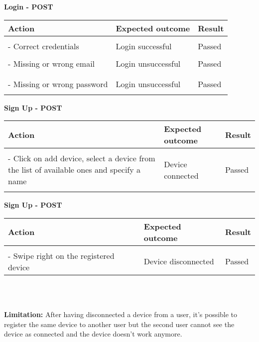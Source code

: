 \textbf{Login - POST}
\begin{center}
	\begin{tabular}{|p{}|p{}|p{}|}
		\hline
		Action & Expected outcome & Result \\
		\hline
		&&\\
		- Correct credentials & Login successful & Passed\\
		\hline
		&&\\
		- Missing or wrong email & Login unsuccessful & Passed\\
		&&\\
		\hline
		&&\\
		- Missing or wrong password & Login unsuccessful & Passed\\
		&&\\
		\hline
	\end{tabular}
\end{center}

\newpage

\textbf{Sign Up - POST}
\begin{center}
	\begin{tabular}{|p{}|p{}|p{}|}
		\hline
		Action & Expected outcome & Result \\
		\hline
		&&\\
		- Click on add device, select a device from the list of available ones and specify a name & Device connected & Passed\\
		&&\\
		\hline
	\end{tabular}
\end{center}

\textbf{Sign Up - POST}
\begin{center}
	\begin{tabular}{|p{}|p{}|p{}|}
		\hline
		Action & Expected outcome & Result \\
		\hline
		&&\\
		- Swipe right on the registered device & Device disconnected & Passed\\
		\hline
	\end{tabular}
	\\
\end{center}

\textbf{\\Limitation:}
After having disconnected a device from a user, it's possible to register the same device to another user but the second user cannot see the device as connected and the device doesn't work anymore.


